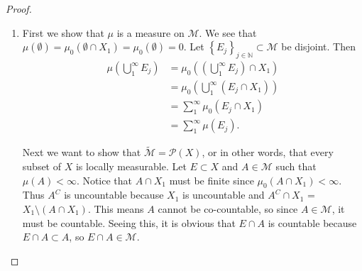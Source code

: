 \documentclass{article}
\theoremstyle{definition}
\begin{document}
\begin{proof}
\begin{enumerate}[label=\textbf{\alph*.}]
		      To show that it extends $\mu$ is easy since by monotonicity, any subset of some $E \in \mathscr{M}$ has measure less than or equal to that of $E$, so \begin{equation*}
			      \underline{\mu}(E) = \sup \left\lbrace \mu(A) : A \in \mathscr{M}\ \mathrm{and}\ A \subset E \right\rbrace = \mu(E).
		      \end{equation*}
		      Now we just need to show saturation.
		      In particular, if $E \in X$ is locally measurable over $\underline{\mu}$, then we need to show that $E \in \widetilde{\mathscr{M}}$.
		      Thus we take $A \in \mathscr{M}$ such that $\mu(A) < \infty$ and see that since $A \in \widetilde{\mathscr{M}}$, $E \cap A \in \widetilde{\mathscr{M}}$.
		      Then $E \cap A$ is locally measurable over $\mu$, so $E \cap A = (E \cap A) \cap A \in \mathscr{M}$.
		      Therefore $\underline{\mu}$ is saturated.
		\item First we show that $\mu$ is a measure on $\mathscr{M}$.
		      We see that $\mu(\emptyset) = \mu_0(\emptyset \cap X_1) = \mu_0(\emptyset) = 0$.
		      Let $\left\lbrace E_j \right\rbrace_{j \in \mathbb{N}} \subset \mathscr{M}$ be disjoint.
		      Then \begin{align*}
			      \mu \left( \bigcup_1^\infty E_j \right) & = \mu_0 \left( \left( \bigcup_1^\infty E_j \right) \cap X_1 \right) \\
			                                              & = \mu_0 \left( \bigcup_1^\infty \left( E_j \cap X_1 \right) \right) \\
			                                              & = \sum_1^\infty \mu_0(E_j \cap X_1)                                 \\
			                                              & = \sum_1^\infty \mu(E_j).
		      \end{align*}

		      Next we want to show that $\widetilde{\mathscr{M}} = \mathscr{P}(X)$, or in other words, that every subset of $X$ is locally measurable.
		      Let $E \subset X$ and $A \in \mathscr{M}$ such that $\mu(A) < \infty$.
		      Notice that $A \cap X_1$ must be finite since $\mu_0(A \cap X_1) < \infty$.
		      Thus $A^C$ is uncountable because $X_1$ is uncountable and $A^C \cap X_1$ = $X_1 \setminus \left( A \cap X_1 \right)$.
		      This means $A$ cannot be co-countable, so since $A \in \mathscr{M}$, it must be countable.
		      Seeing this, it is obvious that $E \cap A$ is countable because $E \cap A \subset A$, so $E \cap A \in \mathscr{M}$.


\end{enumerate}
\end{proof}
\end{document}
